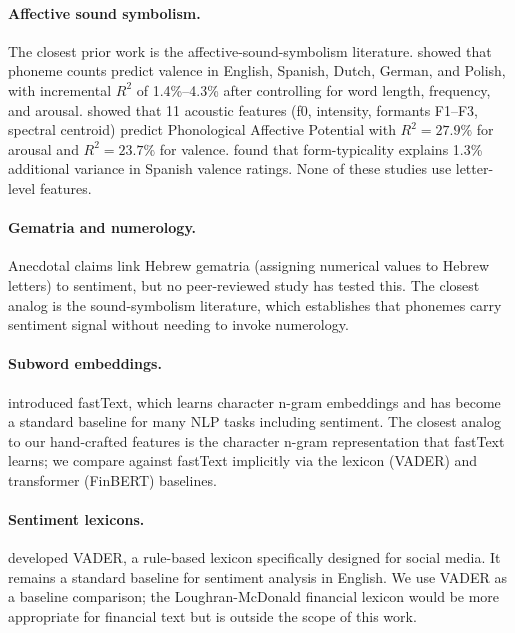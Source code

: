 \documentclass{article}
\begin{document}
\paragraph{Affective sound symbolism.}
The closest prior work is the affective-sound-symbolism literature. \citet{adelman2018} showed that phoneme counts predict valence in English, Spanish, Dutch, German, and Polish, with incremental $R^2$ of 1.4\%--4.3\% after controlling for word length, frequency, and arousal. \citet{aryani2018} showed that 11 acoustic features (f0, intensity, formants F1--F3, spectral centroid) predict Phonological Affective Potential with $R^2 = 27.9\%$ for arousal and $R^2 = 23.7\%$ for valence. \citet{deZubicaray2024} found that form-typicality explains 1.3\% additional variance in Spanish valence ratings. None of these studies use letter-level features.

\paragraph{Gematria and numerology.}
Anecdotal claims link Hebrew gematria (assigning numerical values to Hebrew letters) to sentiment, but no peer-reviewed study has tested this. The closest analog is the sound-symbolism literature, which establishes that phonemes carry sentiment signal without needing to invoke numerology.

\paragraph{Subword embeddings.}
\citet{bojanowski2017} introduced fastText, which learns character n-gram embeddings and has become a standard baseline for many NLP tasks including sentiment. The closest analog to our hand-crafted features is the character n-gram representation that fastText learns; we compare against fastText implicitly via the lexicon (VADER) and transformer (FinBERT) baselines.

\paragraph{Sentiment lexicons.}
\citet{hutto2014} developed VADER, a rule-based lexicon specifically designed for social media. It remains a standard baseline for sentiment analysis in English. We use VADER as a baseline comparison; the Loughran-McDonald financial lexicon would be more appropriate for financial text but is outside the scope of this work.

\end{document}
